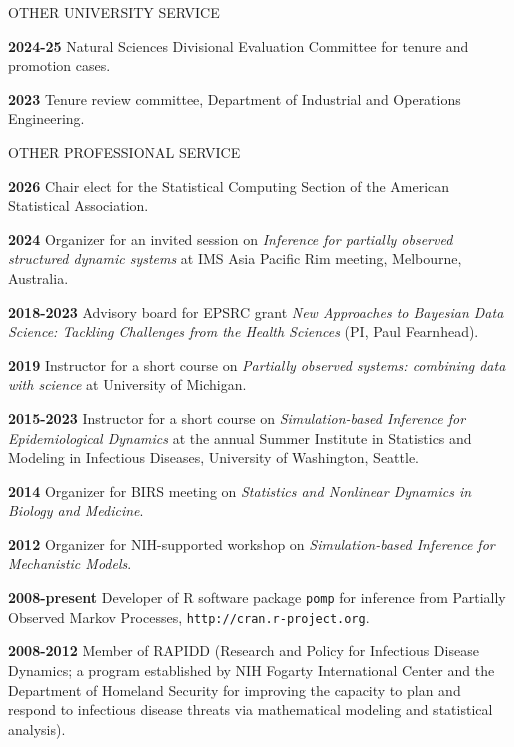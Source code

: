 \lsp

\begin{mylist}{OTHER UNIVERSITY SERVICE}
\item{\bf 2024-25 } Natural Sciences Divisional Evaluation Committee for tenure and promotion cases.
\item{\bf 2023 } Tenure review committee, Department of Industrial and Operations Engineering.
\end{mylist}

\begin{mylist}{OTHER PROFESSIONAL SERVICE}

\item{\bf 2026 } Chair elect for the Statistical Computing Section of the American Statistical Association.
  
\item{\bf 2024 } Organizer for an invited session on {\it Inference for partially observed structured dynamic systems} at IMS Asia Pacific Rim meeting, Melbourne, Australia.
   
\item{\bf 2018-2023 } Advisory board for EPSRC grant {\it New Approaches to Bayesian Data Science: Tackling Challenges from the Health Sciences}  (PI, Paul Fearnhead).

\item{\bf 2019 } Instructor for a short course on {\it Partially observed systems: combining data with science} at University of Michigan.

\item{\bf 2015-2023 } Instructor for a short course on {\it Simulation-based Inference for Epidemiological Dynamics} at the annual Summer Institute in Statistics and Modeling in Infectious Diseases, University of Washington, Seattle.

\item{\bf 2014 } Organizer for BIRS meeting on {\it Statistics and Nonlinear Dynamics in Biology and Medicine}.

\item{\bf 2012 } Organizer for NIH-supported workshop on {\it Simulation-based Inference for Mechanistic Models}.

\item{\bf 2008-present } Developer of R software package {\texttt{pomp}} for inference from Partially Observed Markov Processes, {\texttt{http://cran.r-project.org}}.

\item{\bf 2008-2012 } Member of RAPIDD (Research and Policy for Infectious Disease Dynamics; a program established by NIH Fogarty International Center and the Department of Homeland Security for improving the capacity to plan and respond to infectious disease threats via mathematical modeling and statistical analysis).


\end{mylist}
